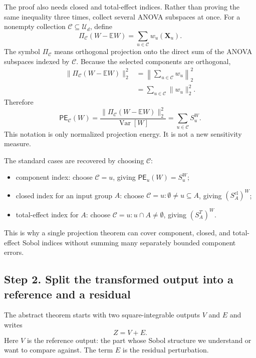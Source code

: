 \documentclass[11pt,letterpaper]{article}
\DeclareMathOperator{\Var}{Var}
\newcommand{\E}{\mathbb{E}}
\newcommand{\bX}{\boldsymbol{X}}
\theoremstyle{remark}
\begin{document}
The proof also needs closed and total-effect indices. Rather than proving the
same inequality three times, collect several ANOVA subspaces at once. For a
nonempty collection $\mathscr C\subseteq\mathcal U_d$, define
\begin{equation}
  \Pi_{\mathscr C}(W-\E W)=\sum_{u\in\mathscr C}w_u(\bX_u).
\end{equation}
The symbol $\Pi_{\mathscr C}$ means orthogonal projection onto the direct sum of
the ANOVA subspaces indexed by $\mathscr C$. Because the selected components are
orthogonal,
\begin{align}
  \|\Pi_{\mathscr C}(W-\E W)\|_2^2
  &=\left\|\sum_{u\in\mathscr C}w_u\right\|_2^2 \\
  &=\sum_{u\in\mathscr C}\|w_u\|_2^2.
\end{align}
Therefore
\begin{equation}
  \mathsf{PE}_{\mathscr C}(W)
  =\frac{\|\Pi_{\mathscr C}(W-\E W)\|_2^2}{\Var[W]}
  =\sum_{u\in\mathscr C}S_u^W.
\end{equation}
This notation is only normalized projection energy. It is not a new sensitivity
measure.

The standard cases are recovered by choosing $\mathscr C$:
\begin{itemize}
  \item component index: choose $\mathscr C={u}$, giving
    $\mathsf{PE}_{{u}}(W)=S_u^W$;
  \item closed index for an input group $A$: choose
    $\mathscr C={u:\emptyset\neq u\subseteq A}$, giving
    $(S_A^{\mathrm{cl}})^W$;
  \item total-effect index for $A$: choose
    $\mathscr C={u:u\cap A\neq\emptyset}$, giving $(S_A^T)^W$.
\end{itemize}
This is why a single projection theorem can cover component, closed, and
total-effect Sobol indices without summing many separately bounded component
errors.

\subsection*{Step 2. Split the transformed output into a reference and a residual}

The abstract theorem starts with two square-integrable outputs $V$ and $E$ and
writes
\begin{equation}
  Z=V+E.
\end{equation}
Here $V$ is the reference output: the part whose Sobol structure we understand or
want to compare against. The term $E$ is the residual perturbation.
\end{document}
